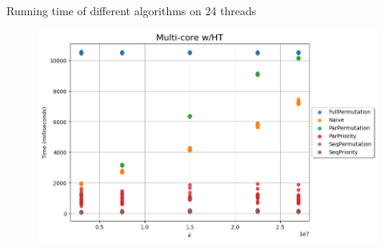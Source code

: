 \begin{frame}{Running time of different algorithms on 24 threads}
  \begin{figure}
    \begin{center}
      \includegraphics[height=0.8\textheight]{figures/multiht_core.png}
    \end{center}
  \end{figure}
\end{frame}
